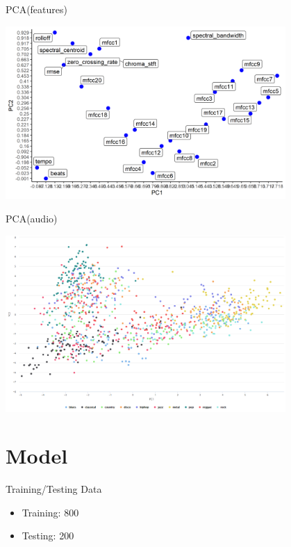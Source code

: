 \documentclass[11pt]{beamer}
\begin{document}
\begin{frame}{PCA(features)}
\begin{center}
    \includegraphics[width=0.8\textwidth]{pca_feat.png}
\end{center}
\end{frame}

\begin{frame}{PCA(audio)}
\begin{center}
    \includegraphics[width=0.8\textwidth]{pca.png}
\end{center}
\end{frame}

\section{Model}

\begin{frame}{Training/Testing Data}
\begin{itemize}
    \item Training: 800
    \item Testing: 200
\end{itemize}
\end{frame}
\end{document}
